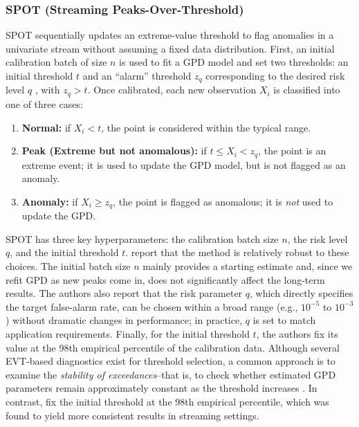 \documentclass{statsmsc}
\begin{document}
\subsubsection{SPOT (Streaming Peaks-Over-Threshold)}

SPOT sequentially updates an extreme-value threshold to flag anomalies in a univariate stream 
without assuming a fixed data distribution. First, an initial calibration batch of size \( n \)  is used 
to fit a GPD model and set two thresholds: an initial threshold \( t \) and an “alarm” threshold 
\( z_q\) corresponding to the desired risk level \( q \) , with \( z_q > t \). Once calibrated, 
each new observation \( X_i \) is classified into one of three cases: 
\begin{enumerate}
    \item \textbf{Normal:} if \( X_i < t \), the point is considered within the typical range.
    \item \textbf{Peak (Extreme but not anomalous):} if \( t \leq X_i < z_q \), the point is an extreme event; it is used to update the GPD model, but is not flagged as an anomaly.
    \item \textbf{Anomaly:} if \( X_i \geq z_q \), the point is flagged as anomalous; it is \emph{not} used to update the GPD.
\end{enumerate}

SPOT has three key hyperparameters: the calibration batch size \( n \), 
the risk level \( q \), and the initial threshold \( t \). 
\citet{siffer2017anomaly} report that the method is relatively robust to these choices. 
The initial batch size \( n \) mainly provides a starting estimate and, 
since we refit GPD as new peaks come in, does not significantly affect the long-term results. 
The authors also report that the risk parameter \( q \), which directly specifies the target false-alarm rate, 
can be chosen within a broad range (e.g., \( 10^{-5} \) to \( 10^{-3} \)) without dramatic changes 
in performance; in practice, \( q \) is set to match application requirements. 
Finally, for the initial threshold \( t \), the authors fix its value at the 98th empirical 
percentile of the calibration data. Although several EVT-based diagnostics exist for threshold selection, a 
common approach is to examine the \emph{stability of exceedances}--that is, to check whether estimated GPD 
parameters remain approximately constant as the threshold increases \citep{Coles2001,beirlant2004statistics}. 
In contrast, \citet{siffer2017anomaly} fix the initial threshold at the 98th empirical percentile, 
which was found to yield more consistent results in streaming settings.
\end{document}

